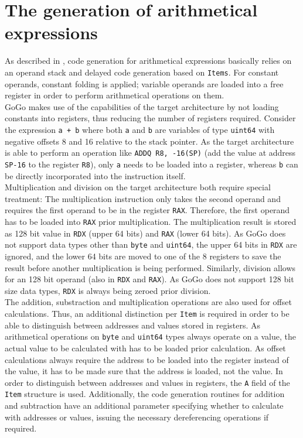 \documentclass[a4paper]{scrreprt}
\begin{document}
    \section{The generation of arithmetical expressions}
      As described in \cite{wir96}, code generation for arithmetical expressions basically relies on an operand stack and delayed code generation based on \texttt{Items}. For constant operands, constant folding is applied; variable operands are loaded into a free register in order to perform arithmetical operations on them.\\
      GoGo makes use of the capabilities of the target architecture by not loading constants into registers, thus reducing the number of registers required. Consider the expression \texttt{a + b} where both \texttt{a} and \texttt{b} are variables of type \texttt{uint64} with negative offsets 8 and 16 relative to the stack pointer. As the target architecture is able to perform an operation like \texttt{ADDQ R8, -16(SP)} (add the value at address \texttt{SP-16} to the register \texttt{R8}), only \texttt{a} needs to be loaded into a register, whereas \texttt{b} can be directly incorporated into the instruction itself.\\
      Multiplication and division on the target architecture both require special treatment: The multiplication instruction only takes the second operand and requires the first operand to be in the register \texttt{RAX}\cite{int09}. Therefore, the first operand has to be loaded into \texttt{RAX} prior multiplication. The multiplication result is stored as 128 bit value in \texttt{RDX} (upper 64 bits) and \texttt{RAX} (lower 64 bits). As GoGo does not support data types other than \texttt{byte} and \texttt{uint64}, the upper 64 bits in \texttt{RDX} are ignored, and the lower 64 bits are moved to one of the 8 registers to save the result before another multiplication is being performed. Similarly, division allows for an 128 bit operand (also in \texttt{RDX} and \texttt{RAX}). As GoGo does not support 128 bit size data types, \texttt{RDX} is always being zeroed prior division.\\
      The addition, substraction and multiplication operations are also used for offset calculations. Thus, an additional distinction per \texttt{Item} is required in order to be able to distinguish between addresses and values stored in registers. As arithmetical operations on \texttt{byte} and \texttt{uint64} types always operate on a value, the actual value to be calculated with has to be loaded prior calculation. As offset calculations always require the address to be loaded into the register instead of the value, it has to be made sure that the address is loaded, not the value. In order to distinguish between addresses and values in registers, the \texttt{A} field of the \texttt{Item} structure is used. Additionally, the code generation routines for addition and subtraction have an additional parameter specifying whether to calculate with addresses or values, issuing the necessary dereferencing operations if required.
\end{document}
